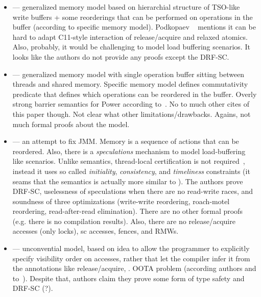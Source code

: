   \begin{itemize}

  \item \cite{Boudol-Gustavo:POPL09} --- 
    generalized memory model based on hierarchial structure of 
    TSO-like write buffers + some reorderings that can be performed on operations in the buffer
    (according to specific memory model). 
    Podkopaev \etal~ mentions it can be hard to adapt C11-style interaction of release/acquire and relaxed atomics.
    Also, probably, it would be challenging to model load buffering scenarios.
    It looks like the authors do not provide any proofs except the DRF-SC.

  \item \cite{Boudol-al:EXPRESS12} --- 
    generalized memory model with single operation buffer 
    sitting between threads and shared memory. 
    Specific memory model defines commutativity predicate that defines which operations can be reordered in the buffer.
    Overly strong barrier semantics for Power according to~\cite{Alglave-al:TOPLAS14}. 
    No to much other cites of this paper though. Not clear what other limitations/drawbacks.
    Agains, not much formal proofs about the model.

  \item \cite{Jagadeesan-el:ESOP10} --- 
    an attempt to fix JMM. 
    Memory is a sequence of actions that can be reordered.
    Also, there is a \emph{speculations} mechanism to model load-buffering like scenarios.
    Unlike \Promising semantics, thread-local certification is not required~\cite{Kang-al:POPL17}, 
    instead it uses so called \textit{initiality}, \textit{consistency}, and \textit{timeliness} constraints
    (it seams that the semantics is actually more similar to \Weakest).
    The authors prove DRF-SC, uselessness of speculations when there are no read-write races,
    and soundness of three optimizations (write-write reordering, roach-motel reordering, read-after-read elimination).
    There are no other formal proofs (e.g. there is no compilation results).
    Also, there are no release/acquire accesses (only locks), sc accesses, fences, and RMWs.

  \item \cite{Crary-Sullivan:POPL15} --- 
    unconvential model, based on idea to allow the programmer 
    to explicitly specify visibility order on accesses, rather that let the compiler infer it 
    from the annotations like release/acquire, \etc.
    OOTA problem (according authors and to~\cite{Kang-al:POPL17}).
    Despite that, authors claim they prove some form of type safety and DRF-SC (?).

  \end{itemize}
